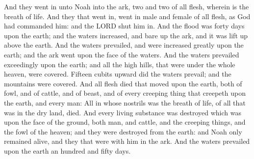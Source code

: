 \begin{biblechapter}
\verse And they went in unto Noah into the ark, two and two of all flesh, wherein is the breath of life.
\verse And they that went in, went in male and female of all flesh, as God had commanded him: and the LORD shut him in.
\verse And the flood was forty days upon the earth; and the waters increased, and bare up the ark, and it was lift up above the earth.
\verse And the waters prevailed, and were increased greatly upon the earth; and the ark went upon the face of the waters.
\verse And the waters prevailed exceedingly upon the earth; and all the high hills, that were under the whole heaven, were covered.
\verse Fifteen cubits upward did the waters prevail; and the mountains were covered.
\verse And all flesh died that moved upon the earth, both of fowl, and of cattle, and of beast, and of every creeping thing that creepeth upon the earth, and every man:
\verse All in whose nostrils was the breath of life, of all that was in the dry land, died.
\verse And every living substance was destroyed which was upon the face of the ground, both man, and cattle, and the creeping things, and the fowl of the heaven; and they were destroyed from the earth: and Noah only remained alive, and they that were with him in the ark.
\verse And the waters prevailed upon the earth an hundred and fifty days.
\end{biblechapter}

